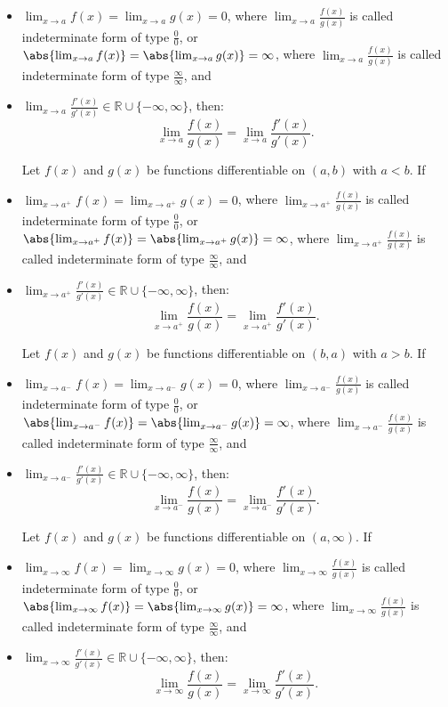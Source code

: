 \documentclass[a4paper,12pt]{report}
\begin{document}
\begin{itemize}
\begin{itemize}
\subsubsection{(General form of) L'Hôpital's rule or Bernoulli's rule and indeterminate quotients}
Let $I$ be an open interval and $a\in I$, and $f(x)$ and $g(x)$ be functions differentiable on $I\setminus\{a\}$. If
\bit
\item $\lim_{x\to a}f(x)=\lim_{x\to a}g(x)=0$, where $\lim_{x\to a}\frac{f(x)}{g(x)}$ is called indeterminate form of type $\frac{0}{0}$, or $\abs{\lim_{x\to a}f(x)}=\abs{\lim_{x\to a}g(x)}=\infty$, where $\lim_{x\to a}\frac{f(x)}{g(x)}$ is called indeterminate form of type $\frac{\infty}{\infty}$, and
\item $\lim_{x\to a}\frac{f'(x)}{g'(x)}\in\mathbb{R}\cup\{-\infty,\infty\}$,
\eit
then:
\[\lim_{x\to a}\frac{f(x)}{g(x)}=\lim_{x\to a}\frac{f'(x)}{g'(x)}.\]

Let $f(x)$ and $g(x)$ be functions differentiable on $(a,b)$ with $a<b$. If
\bit
\item $\lim_{x\to a^+}f(x)=\lim_{x\to a^+}g(x)=0$, where $\lim_{x\to a^+}\frac{f(x)}{g(x)}$ is called indeterminate form of type $\frac{0}{0}$, or $\abs{\lim_{x\to a^+}f(x)}=\abs{\lim_{x\to a^+}g(x)}=\infty$, where $\lim_{x\to a^+}\frac{f(x)}{g(x)}$ is called indeterminate form of type $\frac{\infty}{\infty}$, and
\item $\lim_{x\to a^+}\frac{f'(x)}{g'(x)}\in\mathbb{R}\cup\{-\infty,\infty\}$,
\eit
then:
\[\lim_{x\to a^+}\frac{f(x)}{g(x)}=\lim_{x\to a^+}\frac{f'(x)}{g'(x)}.\]

Let $f(x)$ and $g(x)$ be functions differentiable on $(b,a)$ with $a>b$. If
\bit
\item $\lim_{x\to a^-}f(x)=\lim_{x\to a^-}g(x)=0$, where $\lim_{x\to a^-}\frac{f(x)}{g(x)}$ is called indeterminate form of type $\frac{0}{0}$, or $\abs{\lim_{x\to a^-}f(x)}=\abs{\lim_{x\to a^-}g(x)}=\infty$, where $\lim_{x\to a^-}\frac{f(x)}{g(x)}$ is called indeterminate form of type $\frac{\infty}{\infty}$, and
\item $\lim_{x\to a^-}\frac{f'(x)}{g'(x)}\in\mathbb{R}\cup\{-\infty,\infty\}$,
\eit
then:
\[\lim_{x\to a^-}\frac{f(x)}{g(x)}=\lim_{x\to a^-}\frac{f'(x)}{g'(x)}.\]

Let $f(x)$ and $g(x)$ be functions differentiable on $(a,\infty)$. If
\bit
\item $\lim_{x\to\infty}f(x)=\lim_{x\to\infty}g(x)=0$, where $\lim_{x\to\infty}\frac{f(x)}{g(x)}$ is called indeterminate form of type $\frac{0}{0}$, or $\abs{\lim_{x\to\infty}f(x)}=\abs{\lim_{x\to\infty}g(x)}=\infty$, where $\lim_{x\to\infty}\frac{f(x)}{g(x)}$ is called indeterminate form of type $\frac{\infty}{\infty}$, and
\item $\lim_{x\to\infty}\frac{f'(x)}{g'(x)}\in\mathbb{R}\cup\{-\infty,\infty\}$,
\eit
then:
\[\lim_{x\to\infty}\frac{f(x)}{g(x)}=\lim_{x\to\infty}\frac{f'(x)}{g'(x)}.\]


\end{itemize}
\end{itemize}
\end{document}
